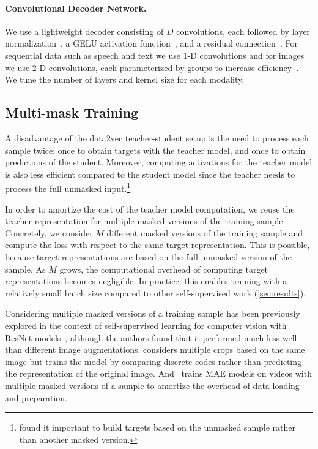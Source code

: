 \documentclass[nohyperref]{article}
\theoremstyle{plain}
\theoremstyle{definition}
\theoremstyle{remark}
\begin{document}
\paragraph{Convolutional Decoder Network.}
We use a lightweight decoder consisting of $D$ convolutions, each followed by layer normalization~\citep{ba2016layer}, a GELU activation function~\citep{hendrycks2016gaussian}, and a residual connection~\citep{he2015deep}.
For sequential data such as speech and text we use 1-D convolutions and for images we use 2-D convolutions, each parameterized by groups to increase efficiency~\citep{krizhevsky2012alexnet}.
We tune the number of layers and kernel size for each modality.



\subsection{Multi-mask Training}
\label{sec:multimask}

A disadvantage of the data2vec teacher-student setup is the need to process each sample twice: once to obtain targets with the teacher model, and once to obtain predictions of the student.
Moreover, computing activations for the teacher model is also less efficient compared to the student model since the teacher needs to process the full unmasked input.\footnote{\citet{baevski2022d2v} found it important to build targets based on the unmasked sample rather than another masked version.} 

In order to amortize the cost of the teacher model computation, we reuse the teacher representation for multiple masked versions of the training sample.
Concretely, we consider $M$ different masked versions of the training sample and compute the loss with respect to the same target representation. 
This is possible, because target representations are based on the full unmasked version of the sample.
As $M$ grows, the computational overhead of computing target representations becomes negligible.
In practice, this enables training with a relatively small batch size compared to other self-supervised work (\textsection\ref{sec:results}).

Considering multiple masked versions of a training sample has been previously explored in the context of self-supervised learning for computer vision with ResNet models~\citep{jing2022maskedsiamese}, although the authors found that it performed much less well than different image augmentations. \citet{caron2020contrastive} considers multiple crops based on the same image but trains the model by comparing discrete codes rather than predicting the representation of the original image.
And~\citet{girdhar2022omnimae} trains MAE models on videos with multiple masked versions of a sample to amortize the overhead of data loading and preparation.
\end{document}
